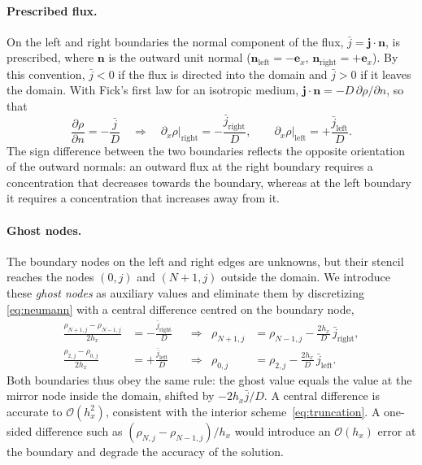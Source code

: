 \documentclass[11pt,a4paper]{article}
\numberwithin{equation}{section}
\theoremstyle{definition}
\theoremstyle{remark}
\newcommand{\bigO}[1]{\mathcal{O}\!\left(#1\right)}
\newcommand{\bj}{\bm{j}}
\newcommand{\bn}{\bm{n}}
\newcommand{\be}{\bm{e}}
\newcommand{\jleft}{\bar{j}_{\mathrm{left}}}
\newcommand{\jright}{\bar{j}_{\mathrm{right}}}
\begin{document}
\paragraph{Prescribed flux.} On the left and right boundaries the normal component of the
flux, $\bar{j} = \bj\cdot\bn$, is prescribed, where $\bn$ is the outward unit normal
($\bn_{\mathrm{left}} = -\be_x$, $\bn_{\mathrm{right}} = +\be_x$). By this convention,
$\bar{j} < 0$ if the flux is directed into the domain and $\bar{j} > 0$ if it leaves the
domain. With Fick's first law for an isotropic medium, $\bj\cdot\bn =
-D\,\partial\rho/\partial n$, so that
\begin{equation}\label{eq:neumann}
  \frac{\partial\rho}{\partial n} = -\frac{\bar{j}}{D}
  \quad\Longrightarrow\quad
  \partial_x\rho\big|_{\mathrm{right}} = -\frac{\jright}{D},
  \qquad
  \partial_x\rho\big|_{\mathrm{left}} = +\frac{\jleft}{D}.
\end{equation}
The sign difference between the two boundaries reflects the opposite orientation of the
outward normals: an outward flux at the right boundary requires a concentration that
decreases towards the boundary, whereas at the left boundary it requires a
concentration that increases away from it.

\paragraph{Ghost nodes.} The boundary nodes on the left and right edges are unknowns, but
their stencil reaches the nodes $(0, j)$ and $(N + 1, j)$ outside the domain. We introduce
these \emph{ghost nodes} as auxiliary values and eliminate them by discretizing
\eqref{eq:neumann} with a central difference centred on the boundary node,
\begin{align}
  \frac{\rho_{N+1,j} - \rho_{N-1,j}}{2h_x} &= -\frac{\jright}{D}
  &&\Longrightarrow&
  \rho_{N+1,j} &= \rho_{N-1,j} - \frac{2h_x}{D}\,\jright,
  \label{eq:ghost-right}\\
  \frac{\rho_{2,j} - \rho_{0,j}}{2h_x} &= +\frac{\jleft}{D}
  &&\Longrightarrow&
  \rho_{0,j} &= \rho_{2,j} - \frac{2h_x}{D}\,\jleft.
  \label{eq:ghost-left}
\end{align}
Both boundaries thus obey the same rule: the ghost value equals the value at the mirror
node inside the domain, shifted by $-2h_x\bar{j}/D$. A central difference is accurate to
$\bigO{h_x^2}$, consistent with the interior scheme~\eqref{eq:truncation}. A one-sided
difference such as $(\rho_{N,j} - \rho_{N-1,j})/h_x$ would introduce an $\bigO{h_x}$
error at the boundary and degrade the accuracy of the solution.
\end{document}
